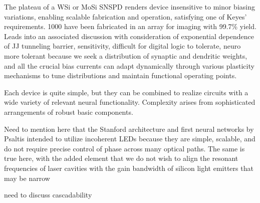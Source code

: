 \vspace{3em}
The plateau of a WSi or MoSi SNSPD renders device insensitive to minor biasing variations, enabling scalable fabrication and operation, satisfying one of Keyes' requirements. 1000 have been fabricated in an array for imaging with 99.7\% yield. Leads into an associated discussion with consideration of exponential dependence of JJ tunneling barrier, sensitivity, difficult for digital logic to tolerate, neuro more tolerant because we seek a distribution of synaptic and dendritic weights, and all the crucial bias currents can adapt dynamically through various plasticity mechanisms to tune distributions and maintain functional operating points.

\vspace{3em}
Each device is quite simple, but they can be combined to realize circuits with a wide variety of relevant neural functionality. Complexity arises from sophisticated arrangements of robust basic components.


\vspace{3em}
Need to mention here that the Stanford architecture and first neural networks by Psaltis intended to utilize incoherent LEDs because they are simple, scalable, and do not require precise control of phase across many optical paths. The same is true here, with the added element that we do not wish to align the resonant frequencies of laser cavities with the gain bandwidth of silicon light emitters that may be narrow

\vspace{3em}
need to discuss cascadability